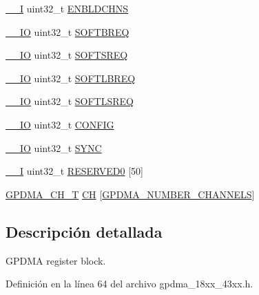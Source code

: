 \begin{DoxyCompactItemize}
\hyperlink{core__sc300_8h_af63697ed9952cc71e1225efe205f6cd3}{\+\_\+\+\_\+I} uint32\+\_\+t \hyperlink{struct_l_p_c___g_p_d_m_a___t_ab6cf4f9f7ccf99f86aa31e7799860648}{E\+N\+B\+L\+D\+C\+H\+NS}
\item 
\hyperlink{core__sc300_8h_aec43007d9998a0a0e01faede4133d6be}{\+\_\+\+\_\+\+IO} uint32\+\_\+t \hyperlink{struct_l_p_c___g_p_d_m_a___t_aba54c67fd4ebe2a1b0753050a7d06581}{S\+O\+F\+T\+B\+R\+EQ}
\item 
\hyperlink{core__sc300_8h_aec43007d9998a0a0e01faede4133d6be}{\+\_\+\+\_\+\+IO} uint32\+\_\+t \hyperlink{struct_l_p_c___g_p_d_m_a___t_a34997f304424883a86b354f19fe3708a}{S\+O\+F\+T\+S\+R\+EQ}
\item 
\hyperlink{core__sc300_8h_aec43007d9998a0a0e01faede4133d6be}{\+\_\+\+\_\+\+IO} uint32\+\_\+t \hyperlink{struct_l_p_c___g_p_d_m_a___t_a10c29fa25f70c95969d96713c329d4fe}{S\+O\+F\+T\+L\+B\+R\+EQ}
\item 
\hyperlink{core__sc300_8h_aec43007d9998a0a0e01faede4133d6be}{\+\_\+\+\_\+\+IO} uint32\+\_\+t \hyperlink{struct_l_p_c___g_p_d_m_a___t_a4f5c850ea4cff593740ef262f7ec6c5a}{S\+O\+F\+T\+L\+S\+R\+EQ}
\item 
\hyperlink{core__sc300_8h_aec43007d9998a0a0e01faede4133d6be}{\+\_\+\+\_\+\+IO} uint32\+\_\+t \hyperlink{struct_l_p_c___g_p_d_m_a___t_aed40378e2ce292435df51ff247d0cb78}{C\+O\+N\+F\+IG}
\item 
\hyperlink{core__sc300_8h_aec43007d9998a0a0e01faede4133d6be}{\+\_\+\+\_\+\+IO} uint32\+\_\+t \hyperlink{struct_l_p_c___g_p_d_m_a___t_aaf260293f48b1c4779012028d6751b17}{S\+Y\+NC}
\item 
\hyperlink{core__sc300_8h_af63697ed9952cc71e1225efe205f6cd3}{\+\_\+\+\_\+I} uint32\+\_\+t \hyperlink{struct_l_p_c___g_p_d_m_a___t_a4769b8c1fb6ecb5670fd9fa9511002d3}{R\+E\+S\+E\+R\+V\+E\+D0} \mbox{[}50\mbox{]}
\item 
\hyperlink{struct_g_p_d_m_a___c_h___t}{G\+P\+D\+M\+A\+\_\+\+C\+H\+\_\+T} \hyperlink{struct_l_p_c___g_p_d_m_a___t_a63c87a432cbd36e189189ae8eadbc29d}{CH} \mbox{[}\hyperlink{group___g_p_d_m_a__18_x_x__43_x_x_gaf7c43b3d13c91c30ddf67e479966d5cd}{G\+P\+D\+M\+A\+\_\+\+N\+U\+M\+B\+E\+R\+\_\+\+C\+H\+A\+N\+N\+E\+LS}\mbox{]}
\end{DoxyCompactItemize}


\subsection{Descripción detallada}
G\+P\+D\+MA register block. 

Definición en la línea 64 del archivo gpdma\+\_\+18xx\+\_\+43xx.\+h.



